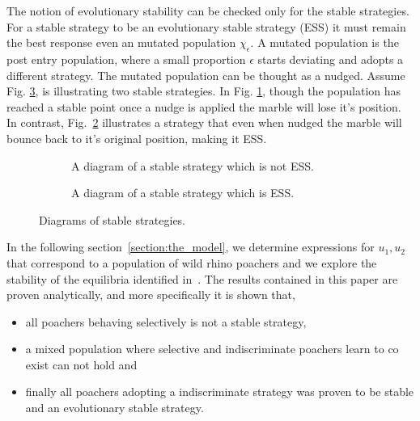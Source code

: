 \documentclass[10pt]{article}
\begin{document}
The notion of evolutionary stability can be checked only for the stable strategies.
For a stable strategy to be an evolutionary stable strategy (ESS) it must remain 
the best response even an mutated population \(\chi_\epsilon\). A mutated population is the post entry population, 
where a small proportion \(\epsilon\) starts deviating and adopts a different strategy.
The mutated population can be thought as a nudged.  Assume Fig.
\ref{fig:stable_ess_driagrams}, is illustrating two stable strategies. In Fig.
\ref{fig:stable_diagram}, though the population has reached a stable point once 
a nudge is applied the marble will lose it's position. In contrast, Fig.~\ref{fig:ess_diagram}
illustrates a strategy that even when nudged the marble will bounce back to it's
original position, making it ESS.

\begin{figure}[!htbp]
\begin{center}
    \begin{subfigure}{0.40\textwidth}
	
	\caption{\label{fig:stable_diagram} A diagram of a stable strategy which 
	is not ESS.}
    \end{subfigure}
    \begin{subfigure}{0.40\textwidth}
	
	\caption{\label{fig:ess_diagram}A diagram of a stable strategy which is ESS.}
    \end{subfigure}
    	\caption{\label{fig:stable_ess_driagrams} Diagrams of stable strategies.}
\end{center}
\end{figure}

In the following section~\ref{section:the_model}, we determine expressions
for \(u_1, u_2\) that correspond to a population of wild rhino poachers and we
explore the stability of the equilibria identified in~\cite{Lee}. The results
contained in this paper are proven analytically, and more specifically it is 
shown that,

\begin{itemize}
	\item all poachers behaving selectively is not a stable strategy,  
	\item a mixed population where selective and indiscriminate poachers
	learn to co exist can not hold and
	\item finally all poachers adopting a indiscriminate strategy was proven to
	be stable and an evolutionary stable strategy.
\end{itemize}
\end{document}
